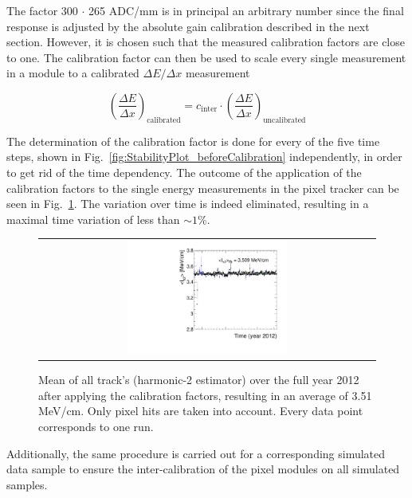 The factor 300 $\cdot$ 265 ADC/mm is in principal an arbitrary number since the final response is adjusted by the absolute gain calibration described in the next section.
However, it is chosen such that the measured calibration factors are close to one.
The calibration factor can then be used to scale every single measurement in a module to a calibrated $\Delta E/\Delta x$ measurement

\begin{equation}
\left( \frac{\Delta E}{\Delta x}\right)_{\text{calibrated}}=c_{\text{inter}} \cdot \left(\frac{\Delta E}{\Delta x}\right)_{\text{uncalibrated}}
\end{equation}

The determination of the calibration factor is done for every of the five time steps, shown in Fig.~\ref{fig:StabilityPlot_beforeCalibration} independently, in order to get rid of the time dependency. 
The outcome of the application of the calibration factors to the single energy measurements in the pixel tracker can be seen in Fig.~\ref{fig:StabilityPlot_afterCalibration}.
The variation over time is indeed eliminated, resulting in a maximal time variation of less than $\sim1$\%.

\begin{figure}[!t]
  \centering 
  \begin{tabular}{c}
  \includegraphics[width=0.49\textwidth]{figures/analysis/PixelCalibration/StabilityPlot_Pixel_afterCalibration_withoutStepFits_NEW.pdf}
  \end{tabular}
  \caption{Mean of all track's \dedx (harmonic-2 estimator) over the full year 2012 after applying the calibration factors, resulting in an average \dedx of 3.51 MeV/cm. Only pixel hits are taken into account. Every data point corresponds to one run.} 
  \label{fig:StabilityPlot_afterCalibration}
\end{figure}


Additionally, the same procedure is carried out for a corresponding simulated data sample to ensure the inter-calibration of the pixel modules on all simulated samples.



